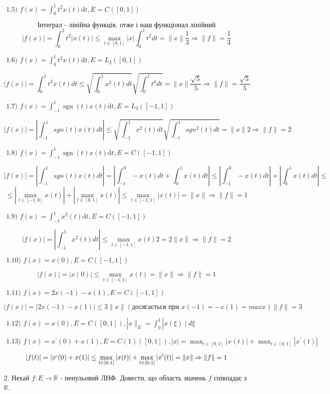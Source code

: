 \begin{tcolorbox}
    $
    \text { 1.5) } f(x)=\int_{0}^{1} t^{2} x(t) \mathrm{d} t, E=C([0,1]) 
    $

    $$ \text{Інтеграл - лінійна функція, отже і наш функціонал лінійний} $$
    $$ |f(x)| = \int_0^2 t^2 |x(t)| \le \max_{t \in[0,1]}|x|\int_{0}^{1}t^2dt = 
    \|x\| \frac{1}{3} \Rightarrow \|f\| = \frac{1}{3}$$

    $
    \text { 1.6) } f(x)=\int_{0}^{1} t^{2} x(t) \mathrm{d} t, E=L_{2}([0,1]) 
    $

    $$ |f(x)| = \int_0^1t^2x(t)dt \le 
    \sqrt{\int_0^1x^2(t)dt} \sqrt{\int_0^1t^4dt} = 
    \|x\|\frac{\sqrt{5}}{5} \Rightarrow \|f\|=\frac{\sqrt{5}}{5}$$

    $
    \text { 1.7) } f(x)=\int_{-1}^{1} \operatorname{sgn}(t) x(t) \mathrm{d} t, E=L_{2}([-1,1]) 
    $

    $$ |f(x)| = |\int_{-1}^1sgn(t)x(t)dt| \le 
    \sqrt{\int_{-1}^1x^2(t)dt} \sqrt{\int_{-1}^{1}sgn^2(t)dt} = 
    \|x\| 2 \Rightarrow \|f\| = 2 $$

    $
    \text { 1.8) } f(x)=\int_{-1}^{1} \operatorname{sgn}(t) x(t) \mathrm{d} t, E=C([-1,1]) 
    $
    
    $$ |f(x)| = |\int_{-1}^1sgn(t)x(t)dt| = 
    | \int_{-1}^{0}-x(t)dt + \int_{0}^1x(t)dt | \le 
    | \int_{-1}^{0}-x(t)dt| + | \int_{0}^1x(t)dt | \le $$ 
    $$
    \le | \max_{t\in[-1,0]}x(t)| + |\max_{t\in[0, 1]}x(t)| \le 
    \max_{t\in[-1, 1]}|x(t)| = \|x\| \Rightarrow \|f\| = 1$$


    $
    \text { 1.9) } f(x)=\int_{-1}^{1}x^{2}(t) \mathrm{d} t, E=C([-1,1]) 
    $

    $$ |f(x)| =|\int_{-1}^{1}x^{2}(t)dt| \le 
    \max_{t \in [-1, 1]} x(t) 2 = 2\|x\| \Rightarrow \|f\| = 2  $$

    $
    \text { 1.10) } f(x)=x(0), E=C([-1,1]) 
    $

    $$|f(x)| = |x(0)| \le \max_{t\in[-1, 1]}x(t) = \|x\| \Rightarrow \|f\| = 1$$

    $
    \text { 1.11) } f(x)=2 x(-1)-x(1), E=C([-1,1]) 
    $

    $$ |f(x)| = |2x(-1) - x(1)| \le 3\|x\| (\text{досягається при } x(-1) = -x(1) = max x) 
    \|f\| = 3 $$

    $
    \text { 1.12) } f(x)=x(0), E=C([0,1]),|x \|_{E}=\int_{0}^{1}| x(\xi) \mid d \xi 
    $

    $
    \text { 1.13) } f(x)=x^{\prime}(0)+x(1), E=C(1)([0,1]),|x|=\max _{t \in[0,1]}|x(t)|+\max _{t \in[0,1]}|x^{\prime}(t)|
    $

    $$|f(t)| = |x`(0) + x(1)| \le \max _{t \in[0,1]}|x(t)|+\max _{t \in[0,1]}|x^{\prime}(t)|=
    \|x\| \Rightarrow \|f\| = 1 $$


\end{tcolorbox}

\begin{tcolorbox}[title=Завдання 2]
    2. Нехай $f: E \rightarrow \mathbb{R}$ - ненульовий ЛНФ. Довести, що область значень $f$ співпадає з $\mathbb{R}$.
\end{tcolorbox}